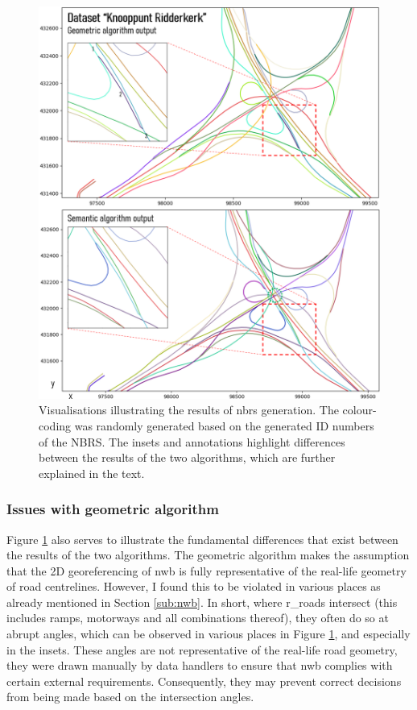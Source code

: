 \begin{figure}
    \centering
    \includegraphics[width=\linewidth]{final_report/figs/nbrsgeneration0.png}
    \caption[Renders illustrating the results of NBRS generation]{Visualisations illustrating the results of \ac{nbrs} generation. The colour-coding was randomly generated based on the generated ID numbers of the NBRS. The insets and annotations highlight differences between the results of the two algorithms, which are further explained in the text.}
    \label{fig:nbrsgeneration0}
\end{figure}

\subsubsection{Issues with geometric algorithm}

Figure \ref{fig:nbrsgeneration0} also serves to illustrate the fundamental differences that exist between the results of the two algorithms. The geometric algorithm makes the assumption that the 2D georeferencing of \ac{nwb} is fully representative of the real-life geometry of road centrelines. However, I found this to be violated in various places as already mentioned in Section \ref{sub:nwb}. In short, where \ac{r_roads} intersect (this includes ramps, motorways and all combinations thereof), they often do so at abrupt angles, which can be observed in various places in Figure \ref{fig:nbrsgeneration0}, and especially in the insets. These angles are not representative of the real-life road geometry, they were drawn manually by data handlers to ensure that \ac{nwb} complies with certain external requirements. Consequently, they may prevent correct decisions from being made based on the intersection angles.

